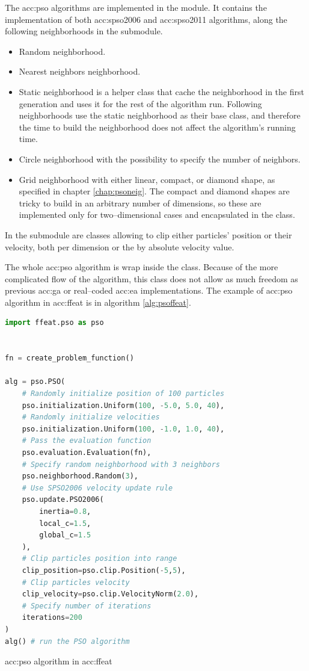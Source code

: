 The \acrlong{acc:pso} algorithms are implemented in the  module. It contains the implementation of both \acrshort{acc:spso2006} and \acrshort{acc:spso2011} algorithms, along the following neighborhoods in the  submodule.
\begin{itemize}
    \item Random neighborhood.
    \item Nearest neighbors neighborhood.
    \item Static neighborhood is a helper class that cache the neighborhood in the first generation and uses it for the rest of the algorithm run. Following neighborhoods use the static neighborhood as their base class, and therefore the time to build the neighborhood does not affect the algorithm's running time.
    \item Circle neighborhood with the possibility to specify the number of neighbors.
    \item Grid neighborhood with either linear, compact, or diamond shape, as specified in chapter \ref{chap:psoneig}. The compact and diamond shapes are tricky to build in an arbitrary number of dimensions, so these are implemented only for two--dimensional cases and encapsulated in the  class.
\end{itemize}

In the  submodule are classes allowing to clip either particles' position or their velocity, both per dimension or the by absolute velocity value.

The whole \acrshort{acc:pso} algorithm is wrap inside the  class. Because of the more complicated flow of the algorithm, this class does not allow as much freedom as previous \acrshort{acc:ga} or real--coded \acrshort{acc:ea} implementations. The example of \acrshort{acc:pso} algorithm in \acrshort{acc:ffeat} is in algorithm \ref{alg:psoffeat}.

\begin{algorithm}[b!]
\begin{lstlisting}[language=Python, xrightmargin=18pt]
import ffeat.pso as pso


fn = create_problem_function()

alg = pso.PSO(
    # Randomly initialize position of 100 particles
    pso.initialization.Uniform(100, -5.0, 5.0, 40),
    # Randomly initialize velocities
    pso.initialization.Uniform(100, -1.0, 1.0, 40),
    # Pass the evaluation function
    pso.evaluation.Evaluation(fn),
    # Specify random neighborhood with 3 neighbors
    pso.neighborhood.Random(3),
    # Use SPSO2006 velocity update rule
    pso.update.PSO2006(
        inertia=0.8, 
        local_c=1.5, 
        global_c=1.5
    ),
    # Clip particles position into range
    clip_position=pso.clip.Position(-5,5),
    # Clip particles velocity
    clip_velocity=pso.clip.VelocityNorm(2.0),
    # Specify number of iterations
    iterations=200
)
alg() # run the PSO algorithm
\end{lstlisting}
\caption{\acrshort*{acc:pso} algorithm in \acrshort*{acc:ffeat}}
\label{alg:psoffeat}
\end{algorithm}
